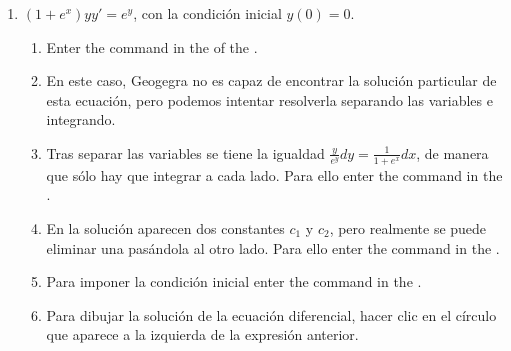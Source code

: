 \begin{enumerate}[leftmargin=*]
\begin{enumerate}
      \item $(1+e^x)yy'=e^y$, con la condición inicial $y(0)=0$.
            \begin{indication}
            \begin{enumerate}
            \item Enter the command  in the  of the .
            \item En este caso, Geogegra no es capaz de encontrar la solución particular de esta ecuación, pero podemos intentar resolverla separando las variables e integrando.
            \item Tras separar las variables se tiene la igualdad $\frac{y}{e^y}dy = \frac{1}{1+e^x}dx$, de manera que sólo hay que integrar a cada lado.
                  Para ello enter the command  in the .
            \item En la solución aparecen dos constantes $c_1$ y $c_2$, pero realmente se puede eliminar una pasándola al otro lado.
                  Para ello enter the command  in the .
            \item Para imponer la condición inicial enter the command  in the .
            \item Para dibujar la solución de la ecuación diferencial, hacer clic en el círculo que aparece a la izquierda de la expresión anterior.
            \end{enumerate}
            \end{indication}
      \end{enumerate}



\end{enumerate}
